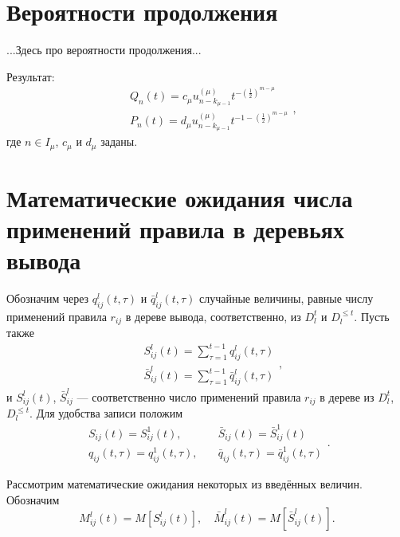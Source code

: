 \documentclass[11pt]{article}
\begin{document}
\section{Вероятности продолжения}

...Здесь про вероятности продолжения...

Результат:
\begin{equation}
    \begin{split}
        &Q_n(t) = c_\mu u^{(\mu)}_{n - k_{\mu-1}} t^{-\left( \frac{1}{2} \right)^{m - \mu}} \\
        &P_n(t) = d_\mu u^{(\mu)}_{n - k_{\mu-1}} t^{-1 -\left( \frac{1}{2} \right)^{m - \mu}}
    \end{split},
\end{equation}
где $n \in I_\mu$, $c_\mu$ и $d_\mu$ заданы.

\section{Математические ожидания числа применений правила в деревьях вывода}

Обозначим через $q^l_{ij}(t,\tau)$ и $\bar{q}^l_{ij}(t,\tau)$ случайные величины, равные числу применений правила $r_{ij}$ в дереве вывода, соответственно, из $D_l^t$ и $D_l^{\leqslant t}$. Пусть также
\begin{equation}
    \begin{split}
        &S^l_{ij}(t) = \sum_{\tau = 1}^{t-1} q^l_{ij}(t,\tau) \\
        &\bar{S}^l_{ij}(t) = \sum_{\tau = 1}^{t-1} \bar{q}^l_{ij}(t,\tau)
    \end{split},
\end{equation}
и $S^l_{ij}(t)$, $\bar{S}^l_{ij}$ --- соответственно число применений правила $r_{ij}$ в дереве из $D_l^t$, $D_l^{\leqslant t}$. Для удобства записи положим
\begin{equation}
    \begin{split}
        S_{ij}(t) = S^1_{ij}(t),&\quad{}\bar{S}_{ij}(t) = \bar{S}^1_{ij}(t) \\
        q_{ij}(t,\tau) = q^1_{ij}(t,\tau),&\quad{}\bar{q}_{ij}(t,\tau) = \bar{q}^1_{ij}(t,\tau)
    \end{split}.
\end{equation}

Рассмотрим математические ожидания некоторых из введённых величин. Обозначим
\begin{equation}
    M^l_{ij}(t) = M[ S^l_{ij}(t) ],\quad{}\bar{M}^l_{ij}(t) = M[ \bar{S}^l_{ij}(t) ].
\end{equation}
\end{document}
